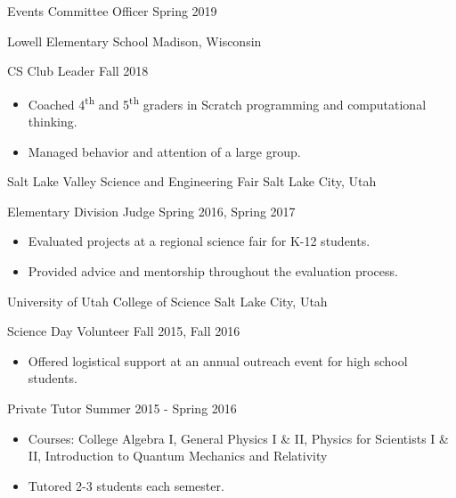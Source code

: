 \begin{tab2} Events Committee Officer \> Spring 2019 \end{tab2}

\blockskip

\begin{tab1} Lowell Elementary School \> Madison, Wisconsin \end{tab1}

\begin{tab2} CS Club Leader \> Fall 2018 \end{tab2}
\begin{itemize}
    \item Coached 4\textsuperscript{th} and 5\textsuperscript{th} graders in Scratch programming and computational thinking.
    \item Managed behavior and attention of a large group.
\end{itemize}

\blockskip

\begin{tab1} Salt Lake Valley Science and Engineering Fair \> Salt Lake City, Utah \end{tab1}

\begin{tab2} Elementary Division Judge \> Spring 2016, Spring 2017 \end{tab2}
\begin{itemize}
    \item Evaluated projects at a regional science fair for K-12 students.
    \item Provided advice and mentorship throughout the evaluation process.
\end{itemize}

\blockskip

\begin{tab1} University of Utah College of Science \> Salt Lake City, Utah \end{tab1}

\begin{tab2} Science Day Volunteer \> Fall 2015, Fall 2016 \end{tab2}
\begin{itemize}
    \item Offered logistical support at an annual outreach event for high school students.
\end{itemize}

\begin{tab2} Private Tutor \> Summer 2015 - Spring 2016 \end{tab2}
\begin{itemize}
    \item Courses: College Algebra I, General Physics I \& II, Physics for Scientists I \& II, Introduction to Quantum Mechanics and Relativity
    \item Tutored 2-3 students each semester.
\end{itemize}

